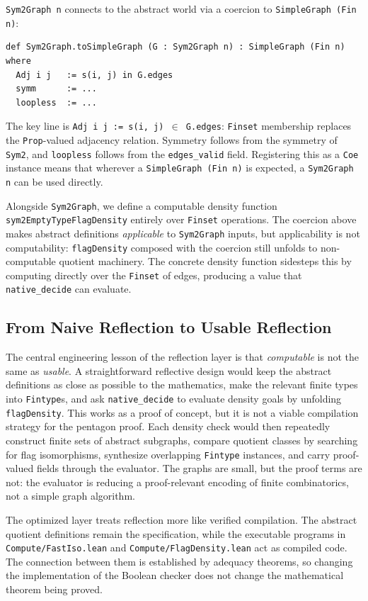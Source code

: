 \documentclass{article}
\newcommand{\lean}[1]{\texttt{#1}}
\begin{document}
\lean{Sym2Graph n} connects to the abstract world via a coercion to
\lean{SimpleGraph (Fin n)}:
\begin{lstlisting}
def Sym2Graph.toSimpleGraph (G : Sym2Graph n) : SimpleGraph (Fin n) where
  Adj i j   := s(i, j) in G.edges
  symm      := ...
  loopless  := ...
\end{lstlisting}
The key line is \lean{Adj i j := s(i, j) \(\in\) G.edges}: \lean{Finset}
membership replaces the \lean{Prop}-valued adjacency relation.  Symmetry
follows from the symmetry of \lean{Sym2}, and \lean{loopless} follows from
the \lean{edges\_valid} field.  Registering this as a \lean{Coe} instance
means that wherever a \lean{SimpleGraph (Fin n)} is expected, a
\lean{Sym2Graph n} can be used directly.

Alongside \lean{Sym2Graph}, we define a computable density function
\lean{sym2EmptyTypeFlagDensity} entirely over \lean{Finset} operations.
The coercion above makes abstract definitions \emph{applicable} to
\lean{Sym2Graph} inputs, but applicability is not computability:
\lean{flagDensity} composed with the coercion still unfolds to
non-computable quotient machinery.  The concrete density function sidesteps
this by computing directly over the \lean{Finset} of edges, producing a
value that \lean{native\_decide} can evaluate.

\subsection{From Naive Reflection to Usable Reflection}
\label{subsec:naive-to-usable}

The central engineering lesson of the reflection layer is that
\emph{computable} is not the same as \emph{usable}.  A straightforward
reflective design would keep the abstract definitions as close as possible to
the mathematics, make the relevant finite types into \lean{Fintype}s, and ask
\lean{native\_decide} to evaluate density goals by unfolding
\lean{flagDensity}.  This works as a proof of concept, but it is not a viable
compilation strategy for the pentagon proof.  Each density check would then
repeatedly construct finite sets of abstract subgraphs, compare quotient
classes by searching for flag isomorphisms, synthesize overlapping
\lean{Fintype} instances, and carry proof-valued fields through the
evaluator.  The graphs are small, but the proof terms are not: the evaluator
is reducing a proof-relevant encoding of finite combinatorics, not a simple
graph algorithm.

The optimized layer treats reflection more like verified compilation.  The
abstract quotient definitions remain the specification, while the executable
programs in \lean{Compute/FastIso.lean} and \lean{Compute/FlagDensity.lean}
act as compiled code.  The connection between them is established by adequacy
theorems, so changing the implementation of the Boolean checker does not
change the mathematical theorem being proved.
\end{document}

